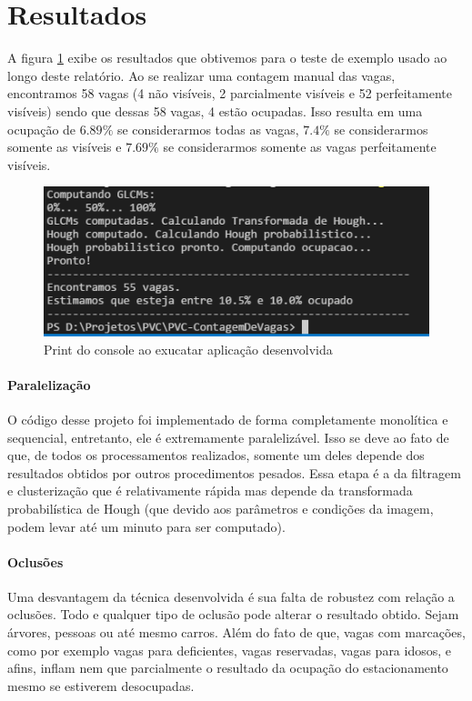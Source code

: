 \documentclass[10pt,twocolumn,letterpaper]{article}
\begin{document}
\section{Resultados}

	A figura \ref{fig:results} exibe os resultados que obtivemos para o teste de exemplo
usado ao longo deste relatório. Ao se realizar uma contagem manual das vagas, encontramos
58 vagas (4 não visíveis, 2 parcialmente visíveis e 52 perfeitamente visíveis) sendo que dessas
58 vagas, 4 estão ocupadas. Isso resulta em uma ocupação de $6.89\%$ se considerarmos
todas as vagas, $7.4\%$ se considerarmos somente as visíveis e $7.69\%$ se considerarmos
somente as vagas perfeitamente visíveis.

\begin{figure}[!htp]
\centering
\includegraphics[width=\columnwidth]{results.png}
 \caption{Print do console ao exucatar aplicação desenvolvida}
\label{fig:results}
\end{figure}

\paragraph{Paralelização}
	O código desse projeto foi implementado de forma completamente monolítica e sequencial,
entretanto, ele é extremamente paralelizável. Isso se deve ao fato de que, de todos os processamentos
realizados, somente um deles depende dos resultados obtidos por outros procedimentos pesados.
Essa etapa é a da filtragem e clusterização que é relativamente rápida mas depende da transformada
probabilística de Hough (que devido aos parâmetros e condições da imagem, podem levar até um minuto
para ser computado).

\paragraph{Oclusões}
	Uma desvantagem da técnica desenvolvida é sua falta de robustez com relação a oclusões.
Todo e qualquer tipo de oclusão pode alterar o resultado obtido. Sejam árvores, pessoas ou até
mesmo carros. Além do fato de que, vagas com marcações, como por exemplo vagas para deficientes,
vagas reservadas, vagas para idosos, e afins, inflam nem que parcialmente o resultado da ocupação
do estacionamento mesmo se estiverem desocupadas.
\end{document}
